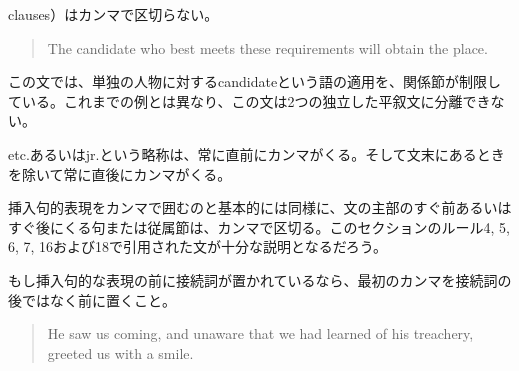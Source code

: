 clauses）はカンマで区切らない。
\begin{quote}
The candidate who best meets these requirements will obtain the place.    
\end{quote}
この文では、単独の人物に対するcandidateという語の適用を、関係節が制限している。これまでの例とは異なり、この文は2つの独立した平叙文に分離できない。
\par
etc.あるいはjr.という略称は、常に直前にカンマがくる。そして文末にあるときを除いて常に直後にカンマがくる。
\par
挿入句的表現をカンマで囲むのと基本的には同様に、文の主部のすぐ前あるいはすぐ後にくる句または従属節は、カンマで区切る。このセクションのルール4,
5, 6, 7, 16および18で引用された文が十分な説明となるだろう。
\par
もし挿入句的な表現の前に接続詞が置かれているなら、最初のカンマを接続詞の後ではなく前に置くこと。
\begin{quote}
He saw us coming, and unaware that we had learned of his treachery,
greeted us with a smile.    
\end{quote}
